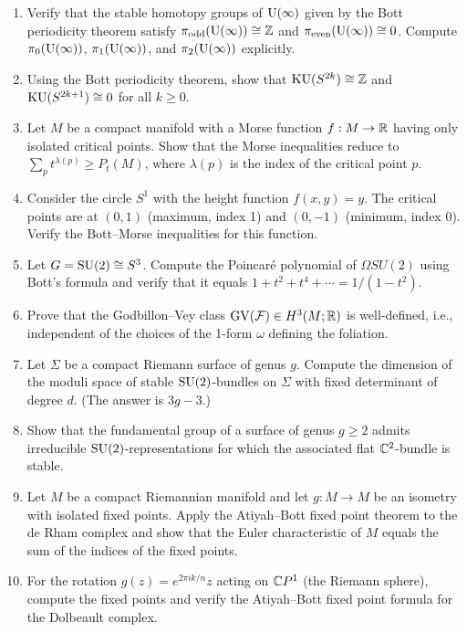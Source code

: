 \begin{enumerate}
    \item [B] Verify that the stable homotopy groups of \(\operatorname{U}(\infty)\) given by the Bott periodicity theorem satisfy \(\pi_{\text{odd}}(\operatorname{U}(\infty)) \cong \mathbb{Z}\) and \(\pi_{\text{even}}(\operatorname{U}(\infty)) \cong 0\). Compute \(\pi_0(\operatorname{U}(\infty))\), \(\pi_1(\operatorname{U}(\infty))\), and \(\pi_2(\operatorname{U}(\infty))\) explicitly.
    \item [B] Using the Bott periodicity theorem, show that \(\operatorname{KU}(S^{2k}) \cong \mathbb{Z}\) and \(\operatorname{KU}(S^{2k+1}) \cong 0\) for all \(k \geq 0\).
    \item [B] Let \(M\) be a compact manifold with a Morse function \(f: M \to \mathbb{R}\) having only isolated critical points. Show that the Morse inequalities reduce to \(\sum_p t^{\lambda(p)} \geq P_t(M)\), where \(\lambda(p)\) is the index of the critical point \(p\).
    \item [B] Consider the circle \(S^1\) with the height function \(f(x,y) = y\). The critical points are at \((0,1)\) (maximum, index 1) and \((0,-1)\) (minimum, index 0). Verify the Bott--Morse inequalities for this function.
    \item [I] Let \(G = \operatorname{SU}(2) \cong S^3\). Compute the Poincar\'e polynomial of \(\Omega SU(2)\) using Bott's formula and verify that it equals \(1 + t^2 + t^4 + \cdots = 1/(1-t^2)\).
    \item [I] Prove that the Godbillon--Vey class \(\operatorname{GV}(\mathcal{F}) \in H^3(M; \mathbb{R})\) is well-defined, i.e., independent of the choices of the 1-form \(\omega\) defining the foliation.
    \item [I] Let \(\Sigma\) be a compact Riemann surface of genus \(g\). Compute the dimension of the moduli space of stable \(\operatorname{SU}(2)\)-bundles on \(\Sigma\) with fixed determinant of degree \(d\). (The answer is \(3g - 3\).)
    \item [I] Show that the fundamental group of a surface of genus \(g \geq 2\) admits irreducible \(\operatorname{SU}(2)\)-representations for which the associated flat \(\mathbb{C}^2\)-bundle is stable.
    \item [I] Let \(M\) be a compact Riemannian manifold and let \(g: M \to M\) be an isometry with isolated fixed points. Apply the Atiyah--Bott fixed point theorem to the de Rham complex and show that the Euler characteristic of \(M\) equals the sum of the indices of the fixed points.
    \item [I] For the rotation \(g(z) = e^{2\pi i k/n}z\) acting on \(\mathbb{C} P^1\) (the Riemann sphere), compute the fixed points and verify the Atiyah--Bott fixed point formula for the Dolbeault complex.

\end{enumerate}
